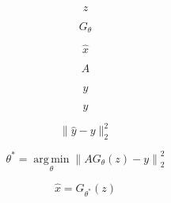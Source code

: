 \[
z
\]

\[
G_{\theta}
\]

\[
\hat{x}
\]

\[
A
\]

\[
\hat{y}
\]

\[
y
\]

\[
\lVert\hat{y}-y\rVert_{2}^{2}
\]

\[
\theta^{\ast}=\operatorname*{arg\,min}_{\theta}\left\lVert A G_{\theta}(z)-y\right\rVert_{2}^{2}
\]

\[
\hat{x}=G_{\theta^{\ast}}(z)
\]
